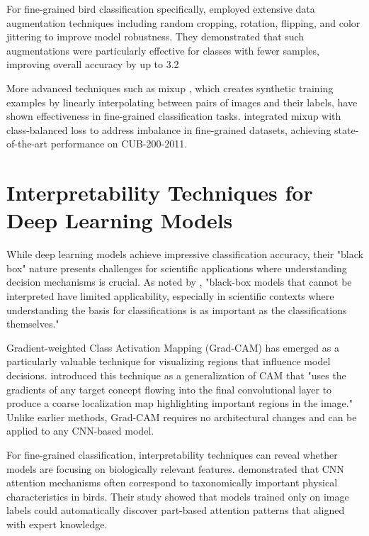 \documentclass[a4paper,12pt]{article}
\begin{document}
For fine-grained bird classification specifically, \citep{chu2020fine} employed extensive data augmentation techniques including random cropping, rotation, flipping, and color jittering to improve model robustness. They demonstrated that such augmentations were particularly effective for classes with fewer samples, improving overall accuracy by up to 3.2%

More advanced techniques such as mixup \citep{zhang2018mixup}, which creates synthetic training examples by linearly interpolating between pairs of images and their labels, have shown effectiveness in fine-grained classification tasks. \citep{cui2019class} integrated mixup with class-balanced loss to address imbalance in fine-grained datasets, achieving state-of-the-art performance on CUB-200-2011.

\section*{Interpretability Techniques for Deep Learning Models}
While deep learning models achieve impressive classification accuracy, their "black box" nature presents challenges for scientific applications where understanding decision mechanisms is crucial. As noted by \citep{montavon2018methods}, "black-box models that cannot be interpreted have limited applicability, especially in scientific contexts where understanding the basis for classifications is as important as the classifications themselves."

Gradient-weighted Class Activation Mapping (Grad-CAM) has emerged as a particularly valuable technique for visualizing regions that influence model decisions. \citep{selvaraju2017grad} introduced this technique as a generalization of CAM that "uses the gradients of any target concept flowing into the final convolutional layer to produce a coarse localization map highlighting important regions in the image." Unlike earlier methods, Grad-CAM requires no architectural changes and can be applied to any CNN-based model.

For fine-grained classification, interpretability techniques can reveal whether models are focusing on biologically relevant features. \citep{zhang2018interpretable} demonstrated that CNN attention mechanisms often correspond to taxonomically important physical characteristics in birds. Their study showed that models trained only on image labels could automatically discover part-based attention patterns that aligned with expert knowledge.
\end{document}

